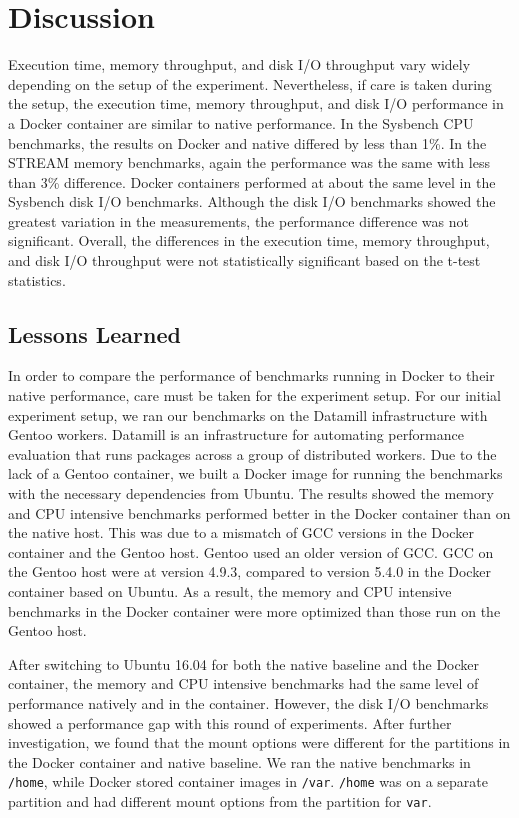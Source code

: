 \documentclass[11pt]{article}
\begin{document}
	\section{Discussion}
	Execution time, memory throughput, and disk I/O throughput vary widely depending on the setup of the experiment. Nevertheless, if care is taken during the setup, the execution time, memory throughput, and disk I/O performance in a Docker container are similar to native performance. In the Sysbench CPU benchmarks, the results on Docker and native differed by less than 1\%. In the STREAM memory benchmarks, again the performance was the same with less than 3\% difference. Docker containers performed at about the same level in the Sysbench disk I/O benchmarks. Although the disk I/O benchmarks showed the greatest variation in the measurements, the performance difference was not significant. Overall, the differences in the execution time, memory throughput, and disk I/O throughput were not statistically significant based on the t-test statistics. 
	
	
	\subsection{Lessons Learned}
	In order to compare the performance of benchmarks running in Docker to their native performance, care must be taken for the experiment setup. For our initial experiment setup, we ran our benchmarks on the Datamill infrastructure with Gentoo workers. Datamill is an infrastructure for automating performance evaluation that runs packages across a group of distributed workers. Due to the lack of a Gentoo container, we built a Docker image for running the benchmarks with the necessary dependencies from Ubuntu. The results showed the memory and CPU intensive benchmarks performed better in the Docker container than on the native host. This was due to a mismatch of GCC versions in the Docker container and the Gentoo host. Gentoo used an older version of GCC. GCC on the Gentoo host were at version 4.9.3, compared to version 5.4.0 in the Docker container based on Ubuntu. As a result, the memory and CPU intensive benchmarks in the Docker container were more optimized than those run on the Gentoo host. 
	
	After switching to Ubuntu 16.04 for both the native baseline and the Docker container, the memory and  CPU intensive benchmarks had the same level of performance natively and in the container. However, the disk I/O benchmarks showed a performance gap with this round of experiments. After further investigation, we found that the mount options were different for the partitions in the Docker container and native baseline. We ran the native benchmarks in \texttt{/home}, while Docker stored container images in \texttt{/var}. \texttt{/home} was on a separate partition and had different mount options from the partition for \texttt{var}. 
	
\end{document}
